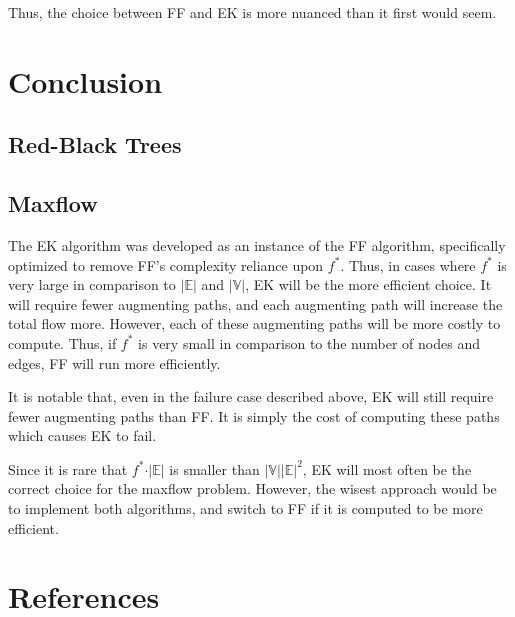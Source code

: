 \documentclass[12pt]{amsart}
\begin{document}
    Thus, the choice between FF and EK is more nuanced than it
    first would seem.

\section{Conclusion}

\subsection{Red-Black Trees}
    

\subsection{Maxflow}

    The EK algorithm was developed as an instance of the FF
    algorithm, specifically optimized to remove FF's complexity
    reliance upon $f^*$. Thus, in cases where $f^*$ is very
    large in comparison to $\vert \mathbb{E} \vert$ and
    $\vert \mathbb{V} \vert$, EK will be the more efficient
    choice. It will require fewer augmenting paths, and each
    augmenting path will increase the total flow more. However,
    each of these augmenting paths will be more costly to
    compute. Thus, if $f^*$ is very small in comparison to the
    number of nodes and edges, FF will run more efficiently.

    It is notable that, even in the failure case described
    above, EK will still require fewer augmenting paths than FF.
    It is simply the cost of computing these paths which causes
    EK to fail.

    Since it is rare that $f^* \cdot \vert \mathbb{E} \vert$ is
    smaller than
    $\vert \mathbb{V} \vert \vert \mathbb{E} \vert ^2$, EK will
    most often be the correct choice for the maxflow problem.
    However, the wisest approach would be to implement both
    algorithms, and switch to FF if it is computed to be more
    efficient.

\newpage
\section{References}
\end{document}
